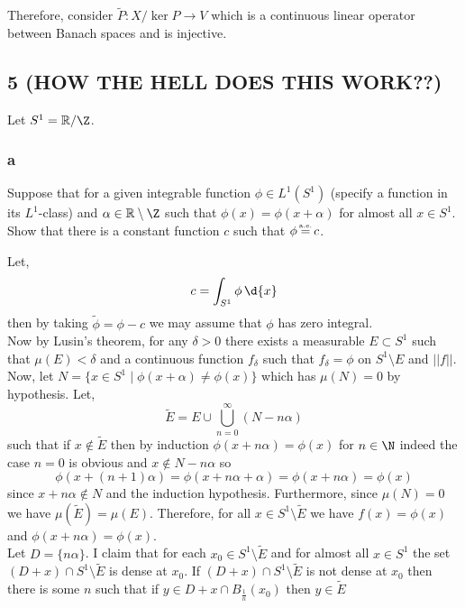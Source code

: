 \documentclass[12pt]{article}
\newcommand{\R}{\mathbb{R}}
\newcommand\eqae{\mathrel{\stackrel{\makebox[0pt]{\mbox{\normalfont\tiny a.e.}}}{=}}}
\begin{document}
Therefore, consider $\tilde{P}  : X / \ker{P} \to V$ which is a continuous linear operator between Banach spaces and is injective. 



\subsection{5 (HOW THE HELL DOES THIS WORK??)}

Let $S^1 = \R / \Z$. 

\subsubsection{a}

\begin{exercise}
Suppose that for a given integrable function $\phi \in L^1(S^1)$ (specify a function in its $L^1$-class) and $\alpha \in \R \setminus \Z$ such that $\phi(x) = \phi(x + \alpha)$ for almost all $x \in S^1$. Show that there is a constant function $c$ such that $\phi \eqae c$.
\end{exercise}

Let, 
\[ c = \int_{S^1} \phi \, \d{x} \]
then by taking $\tilde{\phi} = \phi - c$ we may assume that $\phi$ has zero integral.
\bigskip\\
Now by Lusin's theorem, for any $\delta > 0$ there exists a measurable $E \subset S^1$ such that $\mu(E) < \delta$ and a continuous function $f_\delta$ such that $f_\delta = \phi$ on $S^1 \setminus E$ and $|| f ||$. Now, let $N = \{ x \in S^1 \mid \phi(x + \alpha) \neq \phi(x) \}$ which has $\mu(N) = 0$ by hypothesis. Let,
\[ \tilde{E} = E \cup \bigcup_{n = 0}^\infty (N - n \alpha) \]
such that if $x \notin \tilde{E}$ then by induction $\phi(x + n \alpha) = \phi(x)$ for $n \in \N$ indeed the case $n = 0$ is obvious and $x \notin N - n \alpha$ so 
\[ \phi(x + (n+1)\alpha) = \phi(x + n \alpha + \alpha) = \phi(x + n \alpha) = \phi(x) \]
since $x + n\alpha \notin N$ and the induction hypothesis. Furthermore, since $\mu(N) = 0$ we have $\mu(\tilde{E}) = \mu(E)$. Therefore, for all $x \in S^1 \setminus \tilde{E}$ we have $f(x) = \phi(x)$ and $\phi(x + n \alpha) = \phi(x)$.
\bigskip\\
Let $D = \{ n \alpha \}$. I claim that for each $x_0 \in S^1 \setminus \tilde{E}$ and for almost all $x \in S^1$ the set $(D + x) \cap S^1 \setminus \tilde{E}$ is dense at $x_0$. If $(D + x) \cap S^1 \setminus \tilde{E}$ is not dense at $x_0$ then there is some $n$ such that if $y \in D + x \cap B_{\frac{1}{n}}(x_0)$ then $y \in \tilde{E}$
\end{document}
